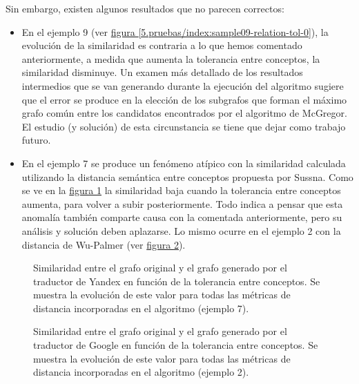 \documentclass[a4paper,12pt,spanish]{book}
\begin{document}
Sin embargo, existen algunos resultados que no parecen correctos:
\begin{itemize}
\item {} 
En el ejemplo 9 (ver \hyperref[5.pruebas/index:sample09-relation-tol-0]{figura  \ref*{5.pruebas/index:sample09-relation-tol-0}}), la evolución de la similaridad
es contraria a lo que hemos comentado anteriormente, a medida que aumenta la tolerancia
entre conceptos, la similaridad disminuye. Un examen más detallado de los
resultados intermedios que se van generando durante la ejecución del algoritmo sugiere
que el error se produce en la elección de los subgrafos que forman el máximo grafo común
entre los candidatos encontrados por el algoritmo de McGregor. El estudio (y solución) de esta
circunstancia se tiene que dejar como trabajo futuro.

\item {} 
En el ejemplo 7 se produce un fenómeno atípico con la similaridad calculada utilizando
la distancia semántica entre conceptos propuesta por Sussna. Como se ve en la
\hyperref[5.pruebas/index:sample07-measures-yandex-synset]{figura  \ref*{5.pruebas/index:sample07-measures-yandex-synset}} la similaridad baja cuando la tolerancia entre
conceptos aumenta, para volver a subir posteriormente. Todo indica a pensar que
esta anomalía también comparte causa con la comentada anteriormente, pero su análisis
y solución deben aplazarse. Lo mismo ocurre en el ejemplo 2 con la distancia de
Wu-Palmer (ver \hyperref[5.pruebas/index:sample02-measures-yandex-synset]{figura  \ref*{5.pruebas/index:sample02-measures-yandex-synset}}).

\end{itemize}
\begin{figure}[htbp]
\centering
\capstart

\caption{Similaridad entre el grafo original y el grafo generado por el traductor de Yandex en función de la tolerancia entre conceptos. Se muestra la evolución de este valor para todas las métricas de distancia incorporadas en el algoritmo (ejemplo 7).}\label{5.pruebas/index:sample07-measures-yandex-synset}\end{figure}
\begin{figure}[htbp]
\centering
\capstart

\caption{Similaridad entre el grafo original y el grafo generado por el traductor de Google en función de la tolerancia entre conceptos. Se muestra la evolución de este valor para todas las métricas de distancia incorporadas en el algoritmo (ejemplo 2).}\label{5.pruebas/index:sample02-measures-yandex-synset}\end{figure}
\end{document}
